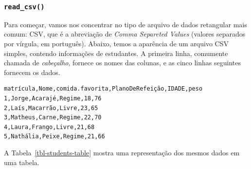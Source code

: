 \documentclass[
  letterpaper,
  DIV=11,
  numbers=noendperiod]{scrreprt}
\begin{document}
\subsubsection{\texorpdfstring{\texttt{read\_csv()}}{read\_csv()}}\label{read_csv}

Para começar, vamos nos concentrar no tipo de arquivo de dados
retangular mais comum: CSV, que é a abreviação de \emph{Comma Separeted
Values} (valores separados por vírgula, em português). Abaixo, temos a
aparência de um arquivo CSV simples, contendo informações de estudantes.
A primeira linha, comumente chamada de \emph{cabeçalho}, fornece os
nomes das colunas, e as cinco linhas seguintes fornecem os dados.

\begin{verbatim}
matrícula,Nome,comida.favorita,PlanoDeRefeição,IDADE,peso
1,Jorge,Acarajé,Regime,18,76
2,Laís,Macarrão,Livre,23,65
3,Matheus,Carne,Regime,22,70
4,Laura,Frango,Livre,21,68
5,Nathália,Peixe,Regime,21,66
\end{verbatim}

A Tabela~\ref{tbl-students-table} mostra uma representação dos mesmos
dados em uma tabela.
\end{document}
